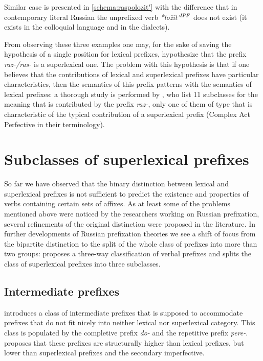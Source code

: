 Similar case is presented in \ref{schema:raspolozit'}
with the difference that in contemporary literal Russian the unprefixed verb \textit{*lo\v{z}it'$^{\mathit{IPF}}$} does not exist (it exists in the colloquial language and in the dialects). 

From observing these three examples one may, for the sake of saving the hypothesis of a single position for lexical prefixes, hypothesize that the prefix \textit{raz-/ras-} is a superlexical one. The problem with this hypothesis is that if one believes that the contributions of lexical and superlexical prefixes have particular characteristics, then the semantics of this prefix patterns with the semantics of lexical prefixes: a thorough study is performed by \citet{JandaNesset:10}, who list 11 subclasses for the meaning that is contributed by the prefix \textit{raz-}, only one of them of  type that is characteristic of the typical contribution of a superlexical prefix (Complex Act Perfective in their terminology).


\section{Subclasses of superlexical prefixes}\label{section:subclasses}
So far we have observed that the binary distinction between lexical and superlexical prefixes is not sufficient to predict the existence and properties of verbs containing certain sets of affixes. As at least some of the problems mentioned above were noticed by the researchers working on Russian prefixation, several refinements of the original distinction were proposed in the literature. In further developments of Russian prefixation theories we see a shift of focus from the bipartite distinction to the split of the whole class of prefixes into more than two groups: \citet{Tatevosov:07} proposes a three-way classification of verbal prefixes and \citet{Tatevosov:09} splits the class of superlexical prefixes into three subclasses.

\subsection{Intermediate prefixes}
\cite{Tatevosov:07} introduces a class of intermediate prefixes that is supposed to accommodate prefixes that do not fit nicely into neither lexical nor superlexical category. This class is populated by the completive prefix \textit{do-} and the repetitive prefix \textit{pere-}. \citet{Tatevosov:07} proposes that these prefixes are structurally higher than lexical prefixes, but lower than superlexical prefixes and the secondary imperfective. 

